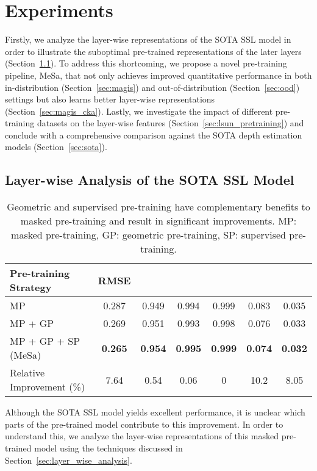 \section{Experiments}
\label{sec:experiments}
Firstly, we analyze the layer-wise representations of the SOTA SSL model in order to illustrate the suboptimal pre-trained representations of the later layers (Section~\ref{sec:sota_cka}). To address this shortcoming, we propose a novel pre-training pipeline, MeSa, that not only achieves improved quantitative performance in both in-distribution (Section~\ref{sec:magis}) and out-of-distribution (Section~\ref{sec:ood}) settings but also learns better layer-wise representations (Section~\ref{sec:magis_cka}). Lastly, we investigate the impact of different pre-training datasets on the layer-wise features (Section~\ref{sec:lsun_pretraining}) and conclude with a comprehensive comparison against the SOTA depth estimation models (Section~\ref{sec:sota}).
\subsection{Layer-wise Analysis of the SOTA SSL Model}
\label{sec:sota_cka}
\begin{table}[b]
\caption{Geometric and supervised pre-training have complementary benefits to masked pre-training and result in significant improvements. MP: masked pre-training, GP: geometric pre-training, SP: supervised pre-training.}
\label{table:nyu}
\centering
\begin{tabular}{lcccccc}
\toprule Pre-training Strategy & RMSE  &  &  &  &  &  \\
\midrule
MP~\citep{xie2022revealing} & 0.287 & 0.949 & 0.994 & 0.999 & 0.083 & 0.035 \\
MP + GP & 0.269 & 0.951 & 0.993 & 0.998 & 0.076 & 0.033 \\
MP + GP + SP (MeSa) & \textbf{0.265} & \textbf{0.954} & \textbf{0.995} & \textbf{0.999} & \textbf{0.074} & \textbf{0.032} \\\midrule
Relative Improvement (\%) & 7.64 & 0.54 & 0.06 & 0 & 10.2 & 8.05 \\
\bottomrule
\end{tabular}
\end{table}
Although the SOTA SSL model yields excellent performance, it is unclear which parts of the pre-trained model contribute to this improvement. In order to understand this, we analyze the layer-wise representations of this masked pre-trained model using the techniques discussed in Section~\ref{sec:layer_wise_analysis}.


